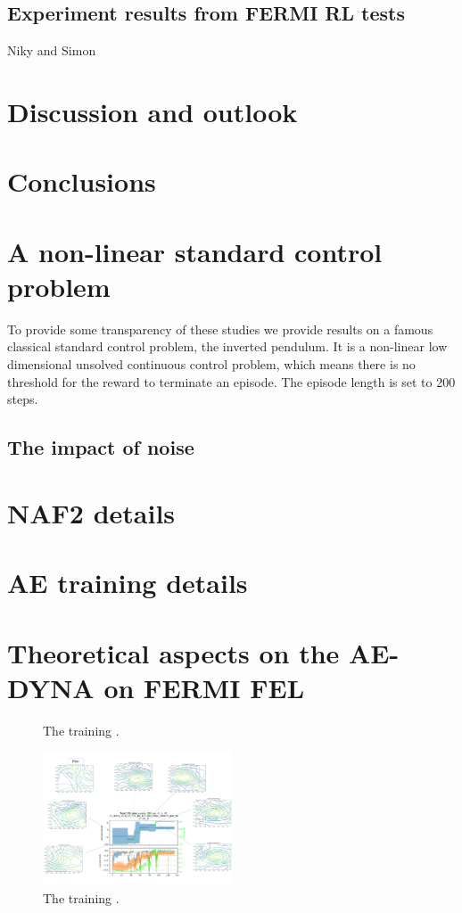 \documentclass[
 reprint,
 amsmath,amssymb,amsfonts,clevref,
 aps,
prstab,
]{revtex4-2}
\begin{document}
\subsection{Experiment results from FERMI RL tests}
Niky and Simon

\section{Discussion and outlook}

\section{Conclusions}


\appendix
\section{A non-linear standard control problem}
To provide some transparency of these studies we provide results on a famous classical standard control problem, the inverted pendulum. It is a non-linear low dimensional unsolved continuous control problem, which means there is no threshold for the reward to terminate an episode. The episode length is set to 200 steps.
\subsection{The impact of noise}
\section{NAF2 details}\label{appendix:naf2}
\section{AE training details}
\section{Theoretical aspects on the AE-DYNA on FERMI FEL}

\begin{figure}[!h]
  \centering
  
  \caption{The training .}
  \label{fig:comparsion_per}
\end{figure}


\begin{figure}[!h]
  \centering
  \includegraphics*[width=0.5\textwidth]{Figures/Learning_evolution}
  \caption{The training .}
  \label{fig:comparsion_per}
\end{figure}
\end{document}

